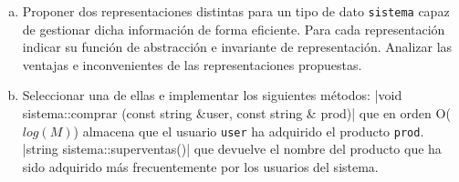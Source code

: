\documentclass[10pt,a4paper,spanish]{report}
\begin{document}
\begin{enumerate}[a)]
      \item Proponer dos representaciones distintas para un tipo de dato \verb*|sistema| capaz de gestionar dicha información de forma eficiente. Para cada representación indicar su función de abstracción e invariante de representación. Analizar las ventajas e inconvenientes de las representaciones propuestas.
      \item Seleccionar una de ellas e implementar los siguientes métodos:
      |void sistema::comprar (const string &user, const string & prod)| que en orden O($log(M)$) almacena que el usuario \verb*|user| ha adquirido el producto \verb*|prod|.
      |string sistema::superventas()| que devuelve el nombre del producto que ha sido adquirido más frecuentemente por los usuarios del sistema.
\end{enumerate}
\end{document}
